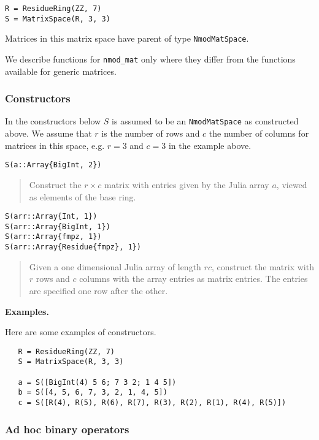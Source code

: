 \documentclass[a4paper,10pt]{article}
\newcommand{\code}{\lstinline}
\newcommand{\desc}[1]{\vspace{-3mm}\begin{quote}#1\end{quote}}
\begin{document}
{{\begin{lstlisting}
R = ResidueRing(ZZ, 7)
S = MatrixSpace(R, 3, 3)
\end{lstlisting}

Matrices in this matrix space have parent of type \code{NmodMatSpace}.

We describe functions for \code{nmod_mat} only where they differ from the functions
available for generic matrices.

\subsubsection{Constructors}

In the constructors below $S$ is assumed to be an \code{NmodMatSpace} as constructed above.
We assume that $r$ is the number of rows and $c$ the number of columns for matrices in this
space, e.g. $r = 3$ and $c = 3$ in the example above.

\begin{lstlisting}
S(a::Array{BigInt, 2})
\end{lstlisting}

\desc{Construct the $r\times c$ matrix with entries given by the Julia array $a$, viewed
as elements of the base ring.}

\begin{lstlisting}
S(arr::Array{Int, 1})
S(arr::Array{BigInt, 1})
S(arr::Array{fmpz, 1})
S(arr::Array{Residue{fmpz}, 1})
\end{lstlisting}

\desc{Given a one dimensional Julia array of length $rc$, construct the matrix with $r$
rows and $c$ columns with the array entries as matrix entries. The entries are specified
one row after the other.}

\textbf{Examples.}

Here are some examples of constructors.

\begin{lstlisting}
   R = ResidueRing(ZZ, 7)
   S = MatrixSpace(R, 3, 3)

   a = S([BigInt(4) 5 6; 7 3 2; 1 4 5])
   b = S([4, 5, 6, 7, 3, 2, 1, 4, 5])
   c = S([R(4), R(5), R(6), R(7), R(3), R(2), R(1), R(4), R(5)])
\end{lstlisting}

\subsubsection{Ad hoc binary operators}

}}
\end{document}
